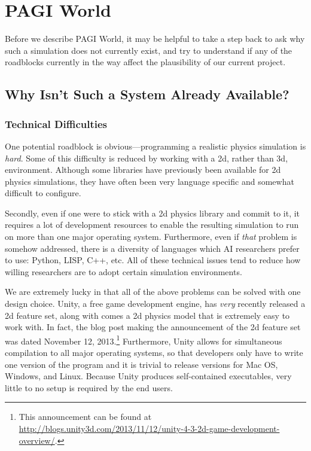 \section{PAGI World}
\label{sect:PAGI_World}

Before we describe PAGI World, it may be helpful to take a step back to ask why such a simulation does not currently exist, and try to understand if any of the roadblocks currently in the way affect the plausibility of our current project.

\subsection{Why Isn't Such a System Already Available?}

\subsubsection{Technical Difficulties}

One potential roadblock is obvious---programming a realistic physics simulation is \textit{hard}. Some of this difficulty is reduced by working with a 2d, rather than 3d, environment. Although some libraries have previously been available for 2d physics simulations, they have often been very language specific and somewhat difficult to configure. 

Secondly, even if one were to stick with a 2d physics library and commit to it, it requires a lot of development resources to enable the resulting simulation to run on more than one major operating system. Furthermore, even if \textit{that} problem is somehow addressed, there is a diversity of languages which AI researchers prefer to use: Python, LISP, C++, etc. All of these technical issues tend to reduce how willing researchers are to adopt certain simulation environments.

We are extremely lucky in that all of the above problems can be solved with one design choice. Unity, a free game development engine, has \textit{very} recently released a 2d feature set, along with comes a 2d physics model that is extremely easy to work with. In fact, the blog post making the announcement of the 2d feature set was dated November 12, 2013.\footnote{This announcement can be found at \url{http://blogs.unity3d.com/2013/11/12/unity-4-3-2d-game-development-overview/}.} Furthermore, Unity allows for simultaneous compilation to all major operating systems, so that developers only have to write one version of the program and it is trivial to release versions for Mac OS, Windows, and Linux. Because Unity produces self-contained executables, very little to no setup is required by the end users.

